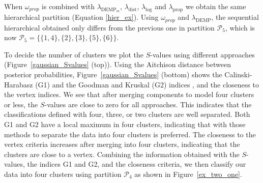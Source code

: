 \documentclass[submit]{smj}
\theoremstyle{definition}
\begin{document}
When $\omega_{prop}$ is combined with $\lambda_{\text{DEMP}_m}$, $\lambda_{\text{dist}}$, $\lambda_{\log}$ and $\lambda_{\text{prop}}$ we obtain the same hierarchical partition (Equation \ref{hier_ex}). Using $\omega_{prop}$ and $\lambda_{\text{DEMP}}$, the sequential hierarchical obtained only differs from the previous one  in partition $\mathcal{P}_5$, which is now $\mathcal{P}_5 = \{\{1, 4\},\{2\}, \{3\},\{5\},\{6\} \}$.

To decide the number of clusters we plot the $S$-values using different approaches (Figure~\ref{gaussian_Svalues} (top)). Using the Aitchison distance between posterior probabilities, Figure~\ref{gaussian_Svalues} (bottom) shows the Calinski-Harabasz (G1) and the Goodman and Kruskal (G2) indices \citep{milligan1985}, and the closeness to the vertex indices. We see that after merging components to model four clusters or less, the $S$-values are close to zero for all approaches. This indicates that the classifications defined with four, three, or two clusters are well separated. Both G1 and G2 have a local maximum in four clusters, indicating that with those methods to separate the data into four clusters is preferred. The closeness to the vertex criteria increases after merging into four clusters, indicating that the clusters are close to a vertex. Combining the information obtained with the $S$-values, the indices G1 and G2, and the closeness criteria, we then classify our data into four clusters using partition $\mathcal{P}_4$ as shown in Figure~\ref{ex_two_one}.
\end{document}
